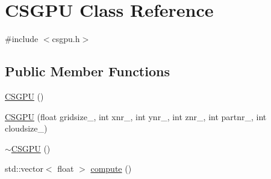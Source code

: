 \hypertarget{class_c_s_g_p_u}{\section{\-C\-S\-G\-P\-U \-Class \-Reference}
\label{class_c_s_g_p_u}
}


{\ttfamily \#include $<$csgpu.\-h$>$}

\subsection*{\-Public \-Member \-Functions}
\begin{DoxyCompactItemize}
\item 
\hyperlink{class_c_s_g_p_u_a24d5da075a7960654334096ecbfdb49b}{\-C\-S\-G\-P\-U} ()
\item 
\hyperlink{class_c_s_g_p_u_a8443e5cf8518155df3f7ff7adff5fcec}{\-C\-S\-G\-P\-U} (float gridsize\-\_\-, int xnr\-\_\-, int ynr\-\_\-, int znr\-\_\-, int partnr\-\_\-, int cloudsize\-\_\-)
\item 
\hyperlink{class_c_s_g_p_u_a4a1672b4a09d646872ddeb4e7edf805a}{$\sim$\-C\-S\-G\-P\-U} ()
\item 
std\-::vector$<$ float $>$ \hyperlink{class_c_s_g_p_u_a23ff255887244e1307b41a657e5e26f5}{compute} ()
\end{DoxyCompactItemize}
